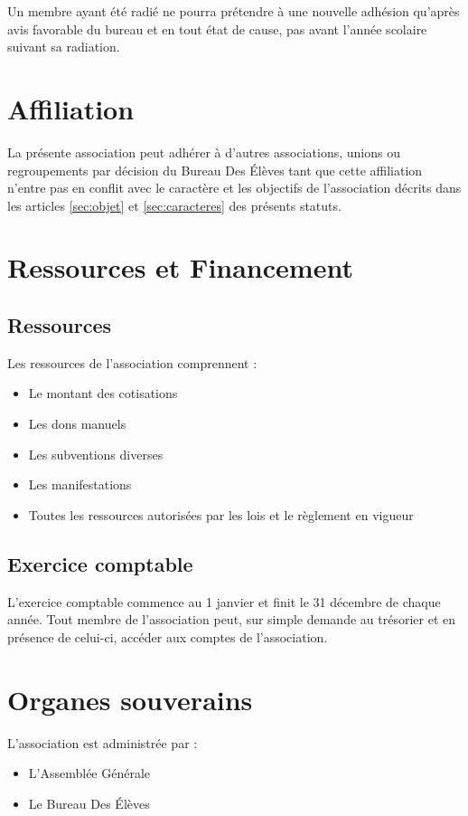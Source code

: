 \documentclass{article} %
\begin{document}
			Un membre ayant été radié ne pourra prétendre à une nouvelle adhésion
			qu’après avis favorable du bureau et en tout état de cause, pas avant
			l’année scolaire suivant sa radiation.

	\section{Affiliation}
		La présente association peut adhérer à d’autres associations, unions ou
		regroupements par décision du Bureau Des Élèves tant que cette affiliation
		n’entre pas en conflit avec le caractère et les objectifs de l’association
		décrits dans les articles \ref{sec:objet} et
		\ref{sec:caracteres} des présents statuts.

	\section{Ressources et Financement}
		\subsection{Ressources}
			Les ressources de l’association comprennent :
			\begin{itemize}
				\item Le montant des cotisations
				\item Les dons manuels
				\item Les subventions diverses
				\item Les manifestations
				\item Toutes les ressources autorisées par les lois et le règlement
			        en vigueur
			\end{itemize}

		\subsection{Exercice comptable}
			L’exercice comptable commence au 1 janvier et finit le 31
			décembre de chaque année. Tout membre de l’association peut, sur simple
			demande au trésorier et en présence de celui-ci, accéder aux comptes de
			l’association.

	\section{Organes souverains}
		L’association est administrée par :
		\begin{itemize}
			\item L’Assemblée Générale
			\item Le Bureau Des Élèves
		\end{itemize}
\end{document}
